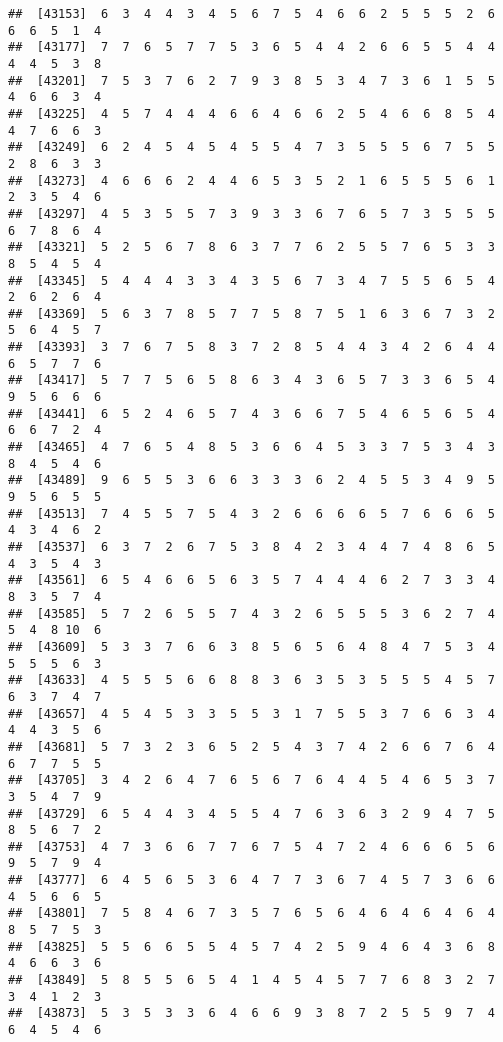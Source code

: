 \documentclass[
]{book}
\begin{document}
\begin{verbatim}
##  [43153]  6  3  4  4  3  4  5  6  7  5  4  6  6  2  5  5  5  2  6  6  6  5  1  4
##  [43177]  7  7  6  5  7  7  5  3  6  5  4  4  2  6  6  5  5  4  4  4  4  5  3  8
##  [43201]  7  5  3  7  6  2  7  9  3  8  5  3  4  7  3  6  1  5  5  4  6  6  3  4
##  [43225]  4  5  7  4  4  4  6  6  4  6  6  2  5  4  6  6  8  5  4  4  7  6  6  3
##  [43249]  6  2  4  5  4  5  4  5  5  4  7  3  5  5  5  6  7  5  5  2  8  6  3  3
##  [43273]  4  6  6  6  2  4  4  6  5  3  5  2  1  6  5  5  5  6  1  2  3  5  4  6
##  [43297]  4  5  3  5  5  7  3  9  3  3  6  7  6  5  7  3  5  5  5  6  7  8  6  4
##  [43321]  5  2  5  6  7  8  6  3  7  7  6  2  5  5  7  6  5  3  3  8  5  4  5  4
##  [43345]  5  4  4  4  3  3  4  3  5  6  7  3  4  7  5  5  6  5  4  2  6  2  6  4
##  [43369]  5  6  3  7  8  5  7  7  5  8  7  5  1  6  3  6  7  3  2  5  6  4  5  7
##  [43393]  3  7  6  7  5  8  3  7  2  8  5  4  4  3  4  2  6  4  4  6  5  7  7  6
##  [43417]  5  7  7  5  6  5  8  6  3  4  3  6  5  7  3  3  6  5  4  9  5  6  6  6
##  [43441]  6  5  2  4  6  5  7  4  3  6  6  7  5  4  6  5  6  5  4  6  6  7  2  4
##  [43465]  4  7  6  5  4  8  5  3  6  6  4  5  3  3  7  5  3  4  3  8  4  5  4  6
##  [43489]  9  6  5  5  3  6  6  3  3  3  6  2  4  5  5  3  4  9  5  9  5  6  5  5
##  [43513]  7  4  5  5  7  5  4  3  2  6  6  6  6  5  7  6  6  6  5  4  3  4  6  2
##  [43537]  6  3  7  2  6  7  5  3  8  4  2  3  4  4  7  4  8  6  5  4  3  5  4  3
##  [43561]  6  5  4  6  6  5  6  3  5  7  4  4  4  6  2  7  3  3  4  8  3  5  7  4
##  [43585]  5  7  2  6  5  5  7  4  3  2  6  5  5  5  3  6  2  7  4  5  4  8 10  6
##  [43609]  5  3  3  7  6  6  3  8  5  6  5  6  4  8  4  7  5  3  4  5  5  5  6  3
##  [43633]  4  5  5  5  6  6  8  8  3  6  3  5  3  5  5  5  4  5  7  6  3  7  4  7
##  [43657]  4  5  4  5  3  3  5  5  3  1  7  5  5  3  7  6  6  3  4  4  4  3  5  6
##  [43681]  5  7  3  2  3  6  5  2  5  4  3  7  4  2  6  6  7  6  4  6  7  7  5  5
##  [43705]  3  4  2  6  4  7  6  5  6  7  6  4  4  5  4  6  5  3  7  3  5  4  7  9
##  [43729]  6  5  4  4  3  4  5  5  4  7  6  3  6  3  2  9  4  7  5  8  5  6  7  2
##  [43753]  4  7  3  6  6  7  7  6  7  5  4  7  2  4  6  6  6  5  6  9  5  7  9  4
##  [43777]  6  4  5  6  5  3  6  4  7  7  3  6  7  4  5  7  3  6  6  4  5  6  6  5
##  [43801]  7  5  8  4  6  7  3  5  7  6  5  6  4  6  4  6  4  6  4  8  5  7  5  3
##  [43825]  5  5  6  6  5  5  4  5  7  4  2  5  9  4  6  4  3  6  8  4  6  6  3  6
##  [43849]  5  8  5  5  6  5  4  1  4  5  4  5  7  7  6  8  3  2  7  3  4  1  2  3
##  [43873]  5  3  5  3  3  6  4  6  6  9  3  8  7  2  5  5  9  7  4  6  4  5  4  6

\end{verbatim}
\end{document}
